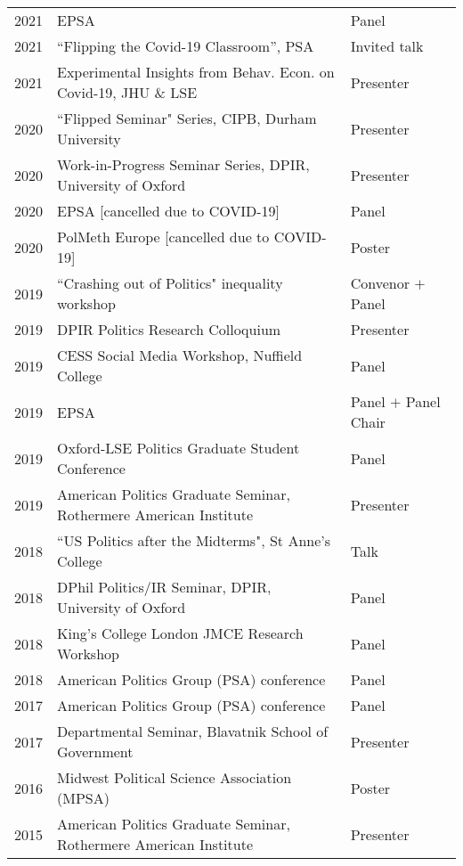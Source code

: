 \documentclass[11pt, a4paper]{article}
\begin{document}
 \begin{tabular}{lll}
     2021 & EPSA & Panel \\
     2021 & ``Flipping the Covid-19 Classroom'', PSA & Invited talk \\
     2021 &  Experimental Insights from Behav. Econ. on Covid-19, JHU \& LSE & Presenter \\
     2020 & ``Flipped Seminar" Series, CIPB, Durham University & Presenter \\
     2020 & Work-in-Progress Seminar Series, DPIR, University of Oxford & Presenter \\
     2020 & EPSA [cancelled due to COVID-19] & Panel \\
     2020 & PolMeth Europe [cancelled due to COVID-19] & Poster \\
     2019 & ``Crashing out of Politics" inequality workshop & Convenor $+$ Panel \\
     2019 & DPIR Politics Research Colloquium & Presenter \\
     2019 & CESS Social Media Workshop, Nuffield College & Panel \\
     2019 & EPSA  & Panel $+$ Panel Chair \\
     2019 & Oxford-LSE Politics Graduate Student Conference & Panel \\
     2019 & American Politics Graduate Seminar, Rothermere American Institute & Presenter \\
     2018 & ``US Politics after the Midterms", St Anne's College & Talk \\
     2018 & DPhil Politics/IR Seminar, DPIR, University of Oxford & Panel \\
     2018 & King's College London JMCE Research Workshop & Panel \\
     2018 & American Politics Group (PSA) conference & Panel \\
     2017 & American Politics Group (PSA) conference & Panel \\
     2017 & Departmental Seminar, Blavatnik School of Government & Presenter \\
     2016 & Midwest Political Science Association (MPSA) & Poster \\
     2015 & American Politics Graduate Seminar, Rothermere American Institute & Presenter
 \end{tabular}
\end{document}
